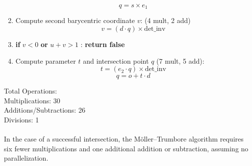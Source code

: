\documentclass{article}
\begin{document}
\begin{enumerate}
    \begin{equation*}
        q = s \times e_1
    \end{equation*}
    \item Compute second barycentric coordinate  $v$:  (4 mult, 2 add)
        \begin{equation*}
            v = (d \cdot q) \times \text{det\_inv}
        \end{equation*}
    \item \textbf{if } $v < 0$ \textbf{or} $u+v > 1$ : \textbf{return false}
    \item Compute parameter $t$ and intersection point $q$ (7 mult, 5 add):
        \begin{equation*}
            t = (e_2 \cdot q) \times \text{det\_inv}
        \end{equation*}
        \begin{equation*}
                q = o + t \cdot d
        \end{equation*}
\end{enumerate}

Total Operations: \\
Multiplications: 30\\
Additions/Subtractions: 26\\
Divisions: 1\\
\\
In the case of a successful intersection, the Möller–Trumbore algorithm requires six fewer multiplications and one additional addition or subtraction, assuming no parallelization.
\end{document}
